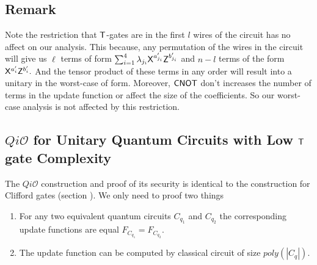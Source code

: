 \subsection{Remark}
\label{remark:nqubit-correction1}
Note the restriction that ${\sf T}$-gates are in the first $l$ wires of the circuit has no affect on our analysis. This because, any permutation of the wires in the circuit will give us $\ell$ terms of form $\sum_{i=1}^4 \lambda_{j_i} {\sf X}^{a_{j_i}^\prime} {\sf Z}^{b_{j_i}^\prime}$ and $n-l$ terms of the form ${\sf X}^{a_{i}^\prime} {\sf Z}^{b_{i}^\prime}.$  And the tensor product of these terms in any order will result into a unitary in the worst-case of form. Moreover, ${\sf CNOT}$ don't increases the number of terms in the update function or affect the size of the coefficients. So our worst-case analysis is not affected by this restriction.


\subsection{$Qi\mathcal{O}$ for Unitary Quantum Circuits with Low ${\sf T}$ gate Complexity}
The $Qi\mathcal{O}$ construction and proof of its security is identical to the  construction for Clifford gates (section ). We only need to proof two things

\begin{enumerate}
\item For any two equivalent quantum circuits $C_{q_1}$ and $C_{q_2}$ the corresponding update functions are equal $F_{C_{q_1}}=F_{C_{q_2}}.$
\item The update function can be computed by classical circuit of size $poly(|C_q|).$
\end{enumerate}

%



